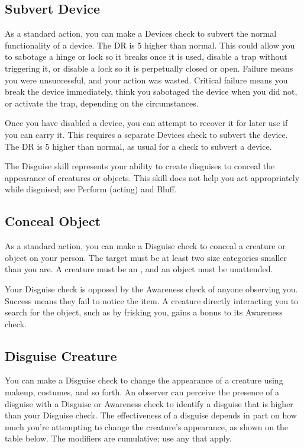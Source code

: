     \subsection{Subvert Device}
        As a standard action, you can make a Devices check to subvert the normal functionality of a device. The DR is 5 higher than normal. This could allow you to sabotage a hinge or lock so it breaks once it is used, disable a trap without triggering it, or disable a lock so it is perpetually closed or open. Failure means you were unsuccessful, and your action was wasted. Critical failure means you break the device immediately, think you sabotaged the device when you did not, or activate the trap, depending on the circumstances.

        Once you have disabled a device, you can attempt to recover it for later use if you can carry it. This requires a separate Devices check to subvert the device. The DR is 5 higher than normal, as usual for a check to subvert a device.

\newpage
{}
        The Disguise skill represents your ability to create disguises to conceal the appearance of creatures or objects. This skill does not help you act appropriately while disguised; see Perform (acting) and Bluff.

    \subsection{Conceal Object}
        As a standard action, you can make a Disguise check to conceal a creature or object on your person.
        The target must be at least two size categories smaller than you are.
        A creature must be an , and an object must be unattended.

        Your Disguise check is opposed by the Awareness check of anyone observing you.
        Success means they fail to notice the item. A creature directly interacting you to search for the object, such as by frisking you, gains a  bonus to its Awareness check.

    \subsection{Disguise Creature}\label{Disguise Creature}
        You can make a Disguise check to change the appearance of a creature using makeup, costumes, and so forth. An observer can perceive the presence of a disguise with a Disguise or Awareness check to identify a disguise that is higher than your Disguise check. The effectiveness of a disguise depends in part on how much you're attempting to change the creature's appearance, as shown on the table below. The modifiers are cumulative; use any that apply.

